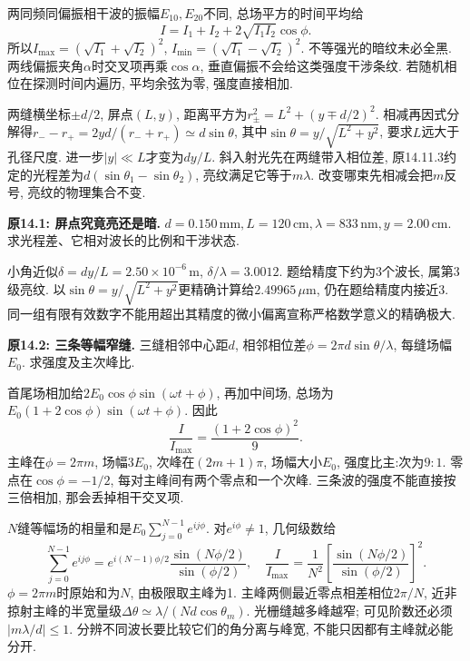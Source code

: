 \label{tb:young-geometry}
两同频同偏振相干波的振幅$E_{10},E_{20}$不同, 总场平方的时间平均给
\[I=I_1+I_2+2\sqrt{I_1I_2}\cos\phi.\]
所以$I_{\max}=(\sqrt{I_1}+\sqrt{I_2})^2$, $I_{\min}=(\sqrt{I_1}-\sqrt{I_2})^2$. 不等强光的暗纹未必全黑. 两线偏振夹角$\alpha$时交叉项再乘$\cos\alpha$, 垂直偏振不会给这类强度干涉条纹. 若随机相位在探测时间内遍历, 平均余弦为零, 强度直接相加.

两缝横坐标$\pm d/2$, 屏点$(L,y)$, 距离平方为$r_\pm^2=L^2+(y\mp d/2)^2$. 相减再因式分解得$r_- -r_+=2yd/(r_-+r_+)\simeq d\sin\theta$, 其中$\sin\theta=y/\sqrt{L^2+y^2}$, 要求$L$远大于孔径尺度. 进一步$|y|\ll L$才变为$dy/L$. 斜入射光先在两缝带入相位差, 原14.11.3约定的光程差为$d(\sin\theta_1-\sin\theta_2)$, 亮纹满足它等于$m\lambda$. 改变哪束先相减会把$m$反号, 亮纹的物理集合不变.

\begin{example}
\textbf{原14.1: 屏点究竟亮还是暗.} $d=0.150\,\mathrm{mm},L=120\,\mathrm{cm},\lambda=833\,\mathrm{nm},y=2.00\,\mathrm{cm}$. 求光程差、它相对波长的比例和干涉状态.
\end{example}
\begin{solution}
小角近似$\delta=dy/L=2.50\times10^{-6}\,\mathrm m$, $\delta/\lambda=3.0012$. 题给精度下约为3个波长, 属第3级亮纹. 以$\sin\theta=y/\sqrt{L^2+y^2}$更精确计算给$2.49965\,\mu\mathrm m$, 仍在题给精度内接近3. 同一组有限有效数字不能用超出其精度的微小偏离宣称严格数学意义的精确极大.
\end{solution}

\label{tb:n-slit}
\begin{example}
\textbf{原14.2: 三条等幅窄缝.} 三缝相邻中心距$d$, 相邻相位差$\phi=2\pi d\sin\theta/\lambda$, 每缝场幅$E_0$. 求强度及主次峰比.
\end{example}
\begin{solution}
首尾场相加给$2E_0\cos\phi\sin(\omega t+\phi)$, 再加中间场, 总场为$E_0(1+2\cos\phi)\sin(\omega t+\phi)$. 因此
\[\frac I{I_{\max}}=\frac{(1+2\cos\phi)^2}9.\]
主峰在$\phi=2\pi m$, 场幅$3E_0$, 次峰在$(2m+1)\pi$, 场幅大小$E_0$, 强度比主:次为$9:1$. 零点在$\cos\phi=-1/2$, 每对主峰间有两个零点和一个次峰. 三条波的强度不能直接按三倍相加, 那会丢掉相干交叉项.
\end{solution}

$N$缝等幅场的相量和是$E_0\sum_{j=0}^{N-1}e^{ij\phi}$. 对$e^{i\phi}\ne1$, 几何级数给
\[\sum_{j=0}^{N-1}e^{ij\phi}=e^{i(N-1)\phi/2}\frac{\sin(N\phi/2)}{\sin(\phi/2)},\quad
\frac I{I_{\max}}=\frac1{N^2}\left[\frac{\sin(N\phi/2)}{\sin(\phi/2)}\right]^2.\]
$\phi=2\pi m$时原始和为$N$, 由极限取主峰为1. 主峰两侧最近零点相差相位$2\pi/N$, 近非掠射主峰的半宽量级$\Delta\theta\simeq\lambda/(Nd\cos\theta_m)$. 光栅缝越多峰越窄; 可见阶数还必须$|m\lambda/d|\le1$. 分辨不同波长要比较它们的角分离与峰宽, 不能只因都有主峰就必能分开.

